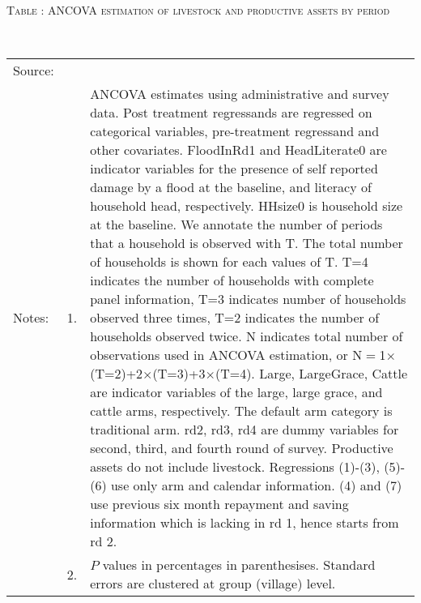 \hspace{-1cm}\begin{minipage}[t]{14cm}
\hfil\textsc{\normalsize Table \thetable: ANCOVA estimation of livestock and productive assets by period\label{tab ANCOVA productive assets timevarying}}\\
\setlength{\tabcolsep}{1pt}
\setlength{\baselineskip}{8pt}
\renewcommand{\arraystretch}{.55}
\hfil{}\\
\renewcommand{\arraystretch}{.8}
\setlength{\tabcolsep}{1pt}
\begin{tabular}{>{\hfill\scriptsize}p{1cm}<{}>{\hfill\scriptsize}p{.25cm}<{}>{\scriptsize}p{12cm}<{\hfill}}
Source:& \multicolumn{2}{l}{\scriptsize Estimated with GUK administrative and survey data.}\\
Notes: & 1. & ANCOVA estimates using administrative and survey data. Post treatment regressands are regressed on categorical variables, pre-treatment regressand and other covariates. \textsf{FloodInRd1} and \textsf{HeadLiterate0} are indicator variables for the presence of self reported damage by a flood at the baseline, and literacy of household head, respectively. \textsf{HHsize0} is household size at the baseline. We annotate the number of periods that a household is observed with \textsf{T}. The total number of households is shown for each values of \textsf{T}. \textsf{T=4} indicates the number of households with complete panel information, \textsf{T=3} indicates number of households observed three times, \textsf{T=2} indicates the number of households observed twice. \textsf{N} indicates total number of observations used in ANCOVA estimation, or \textsf{N$=$1$\times$(T=2)+2$\times$(T=3)+3$\times$(T=4)}.  \textsf{Large}, \textsf{LargeGrace}, \textsf{Cattle} are indicator variables of the \textsf{large}, \textsf{large grace}, and \textsf{cattle} arms, respectively. The default arm category is \textsf{traditional} arm. \textsf{rd2, rd3, rd4} are dummy variables for second, third, and fourth round of survey.  Productive assets do not include livestock. Regressions (1)-(3), (5)-(6) use only arm and calendar information. (4) and (7) use previous six month repayment and saving information which is lacking in rd 1, hence starts from rd 2.\\
& 2. & $P$ values in percentages in parenthesises. Standard errors are clustered at group (village) level.
\end{tabular}
\end{minipage}

